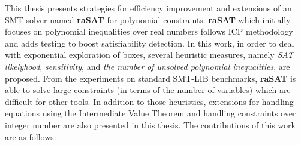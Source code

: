 \documentclass[12pt]{article}
\begin{document}
This thesis presents strategies for efficiency improvement and extensions of an SMT solver named {\bf raSAT} for polynomial constraints. {\bf raSAT} which initially focuses on polynomial inequalities over real numbers follows ICP methodology and adds testing to boost satisfiability detection. In this work, in order to deal with exponential exploration of boxes, several heuristic measures, namely {\em SAT likelyhood}, {\em sensitivity}, and \emph{the number of 
unsolved polynomial inequalities}, are proposed. From the experiments on standard SMT-LIB benchmarks, \textbf{raSAT} is able to solve large constraints (in terms of the number of variables) which are difficult for other tools. 
In addition to those heuristics, extensions for handling equations using the Intermediate Value Theorem and handling constraints over integer number are also presented in this thesis.
The contributions of this work are as follows:
\end{document}
